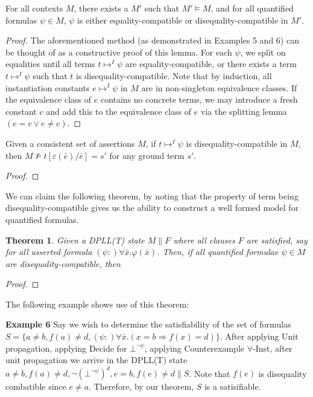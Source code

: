 \documentclass{llncs}
\newtheorem{thm}{Theorem}
\begin{document}
\begin{lemma}
For all contexts $M$, there exists a $M'$ such that $M' \models M$, and for all quantified formulas $\psi \in M$, $\psi$ is either equality-compatible or disequality-compatible in $M'$.
\end{lemma}
\begin{proof}
The aforementioned method (as demonstrated in Examples 5 and 6) can be thought of as a constructive proof of this lemma.
For each $\psi$, we split on equalities until all terms $t \mapsto^I \psi$ are equality-compatible, or there exists a term $t \mapsto^I \psi$ such that $t$ is disequality-compatible.
Note that by induction, all instantiation constants $e \mapsto^I \psi$ in $M$ are in non-singleton equivalence classes.
If the equivalence class of $e$ contains no concrete terms, we may introduce a fresh constant $c$ and add this to the equivalence class of $e$ via the splitting lemma $( e = c \vee e \neq c )$.
\end{proof}

\begin{lemma}
Given a consistent set of assertions $M$, if $t \mapsto^I \psi$ is disequality-compatible in $M$, then $M \not\models t[\varepsilon(\bar{e})/\bar{e}] = s'$ for any ground term $s'$.
\end{lemma}
\begin{proof}

\end{proof}

We can claim the following theorem, by noting that the property of term being disequality-compatible gives us the ability to construct a well formed model for quantified formulas.

\begin{thm}
Given a DPLL(T) state $M \parallel F$ where all clauses $F$ are satisfied, say for all asserted formula $(\psi :) \forall \bar{x}. \varphi(\bar{x} )$.
Then, if all quantified formulae $\psi \in M$ are disequality-compatible, then

\end{thm}
\begin{proof}

\end{proof}



The following example shows use of this theorem:

{\bf Example 6}
Say we wish to determine the satisfiability of the set of formulas $S = \{ a \neq b, f( a ) \neq d, (\psi :) \forall \bar{x}. (x = b \Rightarrow f( x ) = d) \}$.
After applying Unit propagation, applying Decide for $\bot^{\neg \psi}$, applying Counterexample $\forall$-Inst, after unit propagation we arrive in the DPLL(T) state $a \neq b, f( a ) \neq d, \neg( \bot^{\neg \psi} )^d, e = b, f( e ) \neq d \parallel S$.
Note that $f( e )$ is disequality combatible since $e \neq a$.
Therefore, by our theorem, $S$ is a satisifiable. \\
\end{document}
